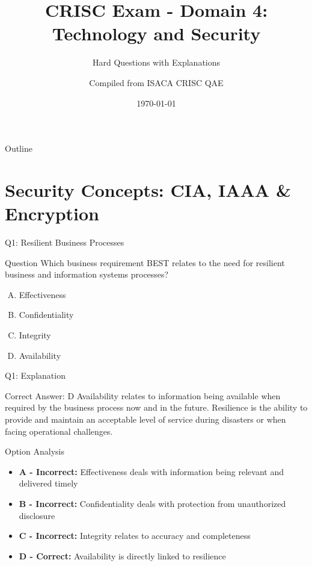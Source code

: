 \documentclass{beamer}
\title{CRISC Exam - Domain 4: Technology and Security}
\subtitle{Hard Questions with Explanations}
\author{Compiled from ISACA CRISC QAE}
\date{\today}
\begin{document}
	
	\begin{frame}
		\titlepage
	\end{frame}
	
	\begin{frame}{Outline}
		\tableofcontents
	\end{frame}
	
	
	\section{Security Concepts: CIA, IAAA \& Encryption}
	
	\begin{frame}{Q1: Resilient Business Processes}
		\begin{block}{Question}
			Which business requirement BEST relates to the need for resilient business and information systems processes?
		\end{block}
		\begin{enumerate}[(A)]
			\item Effectiveness
			\item Confidentiality
			\item Integrity
			\item Availability
		\end{enumerate}
	\end{frame}
	
	\begin{frame}{Q1: Explanation}
		\begin{block}{Correct Answer: D}
			Availability relates to information being available when required by the business process now and in the future. Resilience is the ability to provide and maintain an acceptable level of service during disasters or when facing operational challenges.
		\end{block}
		\begin{block}{Option Analysis}
			\begin{itemize}
				\item \textbf{A - Incorrect:} Effectiveness deals with information being relevant and delivered timely
				\item \textbf{B - Incorrect:} Confidentiality deals with protection from unauthorized disclosure
				\item \textbf{C - Incorrect:} Integrity relates to accuracy and completeness
				\item \textbf{D - Correct:} Availability is directly linked to resilience
			\end{itemize}
		\end{block}
	\end{frame}
	
\end{document}
